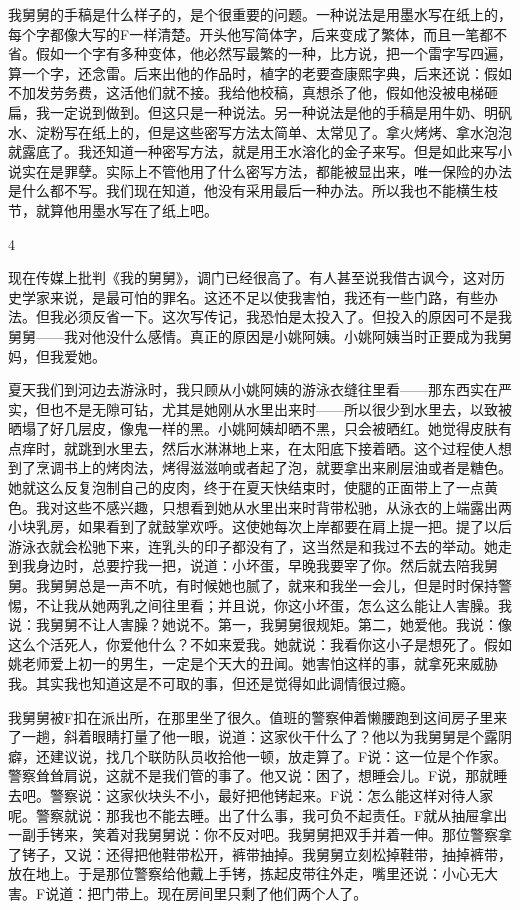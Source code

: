 我舅舅的手稿是什么样子的，是个很重要的问题。一种说法是用墨水写在纸上的，每个字都像大写的F一样清楚。开头他写简体字，后来变成了繁体，而且一笔都不省。假如一个字有多种变体，他必然写最繁的一种，比方说，把一个雷字写四遍，算一个字，还念雷。后来出他的作品时，植字的老要查康熙字典，后来还说：假如不加发劳务费，这活他们就不接。我给他校稿，真想杀了他，假如他没被电梯砸扁，我一定说到做到。但这只是一种说法。另一种说法是他的手稿是用牛奶、明矾水、淀粉写在纸上的，但是这些密写方法太简单、太常见了。拿火烤烤、拿水泡泡就露底了。我还知道一种密写方法，就是用王水溶化的金子来写。但是如此来写小说实在是罪孽。实际上不管他用了什么密写方法，都能被显出来，唯一保险的办法是什么都不写。我们现在知道，他没有采用最后一种办法。所以我也不能横生枝节，就算他用墨水写在了纸上吧。 

4 

现在传媒上批判《我的舅舅》，调门已经很高了。有人甚至说我借古讽今，这对历史学家来说，是最可怕的罪名。这还不足以使我害怕，我还有一些门路，有些办法。但我必须反省一下。这次写传记，我恐怕是太投入了。但投入的原因可不是我舅舅——我对他没什么感情。真正的原因是小姚阿姨。小姚阿姨当时正要成为我舅妈，但我爱她。 

夏天我们到河边去游泳时，我只顾从小姚阿姨的游泳衣缝往里看——那东西实在严实，但也不是无隙可钻，尤其是她刚从水里出来时——所以很少到水里去，以致被晒塌了好几层皮，像鬼一样的黑。小姚阿姨却晒不黑，只会被晒红。她觉得皮肤有点痒时，就跳到水里去，然后水淋淋地上来，在太阳底下接着晒。这个过程使人想到了烹调书上的烤肉法，烤得滋滋响或者起了泡，就要拿出来刷层油或者是糖色。她就这么反复泡制自己的皮肉，终于在夏天快结束时，使腿的正面带上了一点黄色。我对这些不感兴趣，只想看到她从水里出来时背带松驰，从泳衣的上端露出两小块乳房，如果看到了就鼓掌欢呼。这使她每次上岸都要在肩上提一把。提了以后游泳衣就会松驰下来，连乳头的印子都没有了，这当然是和我过不去的举动。她走到我身边时，总要拧我一把，说道：小坏蛋，早晚我要宰了你。然后就去陪我舅舅。我舅舅总是一声不吭，有时候她也腻了，就来和我坐一会儿，但是时时保持警惕，不让我从她两乳之间往里看；并且说，你这小坏蛋，怎么这么能让人害臊。我说：我舅舅不让人害臊？她说不。第一，我舅舅很规矩。第二，她爱他。我说：像这么个活死人，你爱他什么？不如来爱我。她就说：我看你这小子是想死了。假如姚老师爱上初一的男生，一定是个天大的丑闻。她害怕这样的事，就拿死来威胁我。其实我也知道这是不可取的事，但还是觉得如此调情很过瘾。 

我舅舅被F扣在派出所，在那里坐了很久。值班的警察伸着懒腰跑到这间房子里来了一趟，斜着眼睛打量了他一眼，说道：这家伙干什么了？他以为我舅舅是个露阴癖，还建议说，找几个联防队员收拾他一顿，放走算了。F说：这一位是个作家。警察耸耸肩说，这就不是我们管的事了。他又说：困了，想睡会儿。F说，那就睡去吧。警察说：这家伙块头不小，最好把他铐起来。F说：怎么能这样对待人家呢。警察就说：那我也不能去睡。出了什么事，我可负不起责任。F就从抽屉拿出一副手铐来，笑着对我舅舅说：你不反对吧。我舅舅把双手并着一伸。那位警察拿了铐子，又说：还得把他鞋带松开，裤带抽掉。我舅舅立刻松掉鞋带，抽掉裤带，放在地上。于是那位警察给他戴上手铐，拣起皮带往外走，嘴里还说：小心无大害。F说道：把门带上。现在房间里只剩了他们两个人了。 

